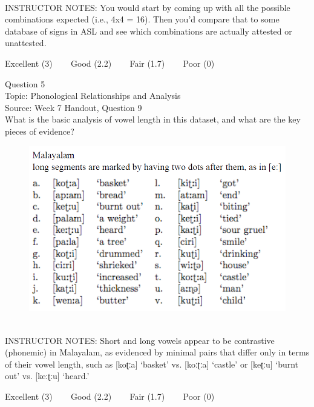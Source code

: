 \documentclass[12pt]{article}
\begin{document}
~\\
INSTRUCTOR NOTES: You would start by coming up with all the possible combinations expected (i.e., 4x4 = 16). Then you'd compare that to some database of signs in ASL and see which combinations are actually attested or unattested.


\vfill
Excellent (3) ~~~ Good (2.2) ~~~ Fair (1.7) ~~~ Poor (0)
\newpage

{\large Question 5}\\

Topic: Phonological Relationships and Analysis\\
Source: Week 7 Handout, Question 9\\

What is the basic analysis of vowel length in this dataset, and what are the key pieces of evidence?\\

\begin{figure}[H]
\includegraphics{../images/malayalam.png}
\end{figure}

~\\
INSTRUCTOR NOTES: Short and long vowels appear to be contrastive (phonemic) in Malayalam, as evidenced by minimal pairs that differ only in terms of their vowel length, such as [koʈːa] ‘basket’ vs. [koːʈːa] ‘castle’ or [keʈːu] ‘burnt out’ vs. [keːʈːu] ‘heard.’


\vfill
Excellent (3) ~~~ Good (2.2) ~~~ Fair (1.7) ~~~ Poor (0)
\newpage

\begin{center}
\textbf{{\color{red}{\HUGE END OF EXAM}}}\\

\end{center}
\newpage
\end{document}
